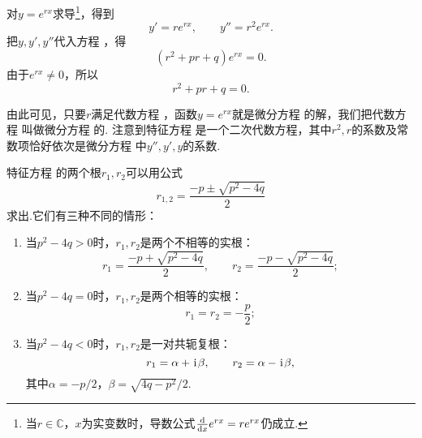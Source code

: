 对\(y = e^{rx}\)求导\footnote{当\(r\in\mathbb{C}\)，\(x\)为实变数时，导数公式\(\dv{x} e^{rx} = r e^{rx}\)仍成立.}，得到\[
y' = r e^{rx}, \qquad y'' = r^2 e^{rx}.
\]把\(y,y',y''\)代入方程 ，得\[
(r^2 + pr + q) e^{rx} = 0.
\]由于\(e^{rx}\neq0\)，所以\begin{equation}\label{equation:微分方程.二阶常系数齐次线性微分方程的特征方程}
r^2 + pr + q = 0.
\end{equation}

由此可见，只要\(r\)满足代数方程 ，函数\(y = e^{rx}\)就是微分方程  的解，我们把代数方程  叫做微分方程  的.
注意到特征方程  是一个二次代数方程，其中\(r^2, r\)的系数及常数项恰好依次是微分方程  中\(y'',y',y\)的系数.

特征方程  的两个根\(r_1,r_2\)可以用公式\[
r_{1,2} = \frac{-p \pm\sqrt{p^2-4q}}{2}
\]求出.它们有三种不同的情形：\begin{enumerate}
\item 当\(p^2-4q>0\)时，\(r_1,r_2\)是两个不相等的实根：\[
r_1 = \frac{-p +\sqrt{p^2-4q}}{2}, \qquad
r_2 = \frac{-p -\sqrt{p^2-4q}}{2};
\]
\item 当\(p^2-4q=0\)时，\(r_1,r_2\)是两个相等的实根：\[
r_1 = r_2 = -\frac{p}{2};
\]
\item 当\(p^2-4q<0\)时，\(r_1,r_2\)是一对共轭复根：\[
r_1 = \alpha+\kern1pt\mathrm{i}\kern1pt\beta, \qquad r_2 = \alpha-\kern1pt\mathrm{i}\kern1pt\beta,
\]其中\(\alpha=-p/2\)，\(\beta=\sqrt{4q-p^2}/2\).
\end{enumerate}

